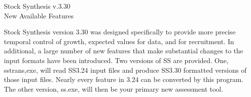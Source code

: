 \documentclass[12pt]{article}
\begin{document}
\begin{center}
	\Large{Stock Synthesis v.3.30\\
	New Available Features\\}
\end{center}

\noindent Stock Synthesis version 3.30 was designed specifically to provide more precise temporal control of growth, expected values for data, and for recruitment.  In additional, a large number of new features that make substantial changes to the input formats have been introduced.  Two versions of SS are provided.  One, sstrans,exe, will read SS3.24 input files and produce SS3.30 formatted versions of those input files.  Nearly every feature in 3.24 can be converted by this program.  The other version, ss.exe, will then be your primary new assessment tool. 
\end{document}

